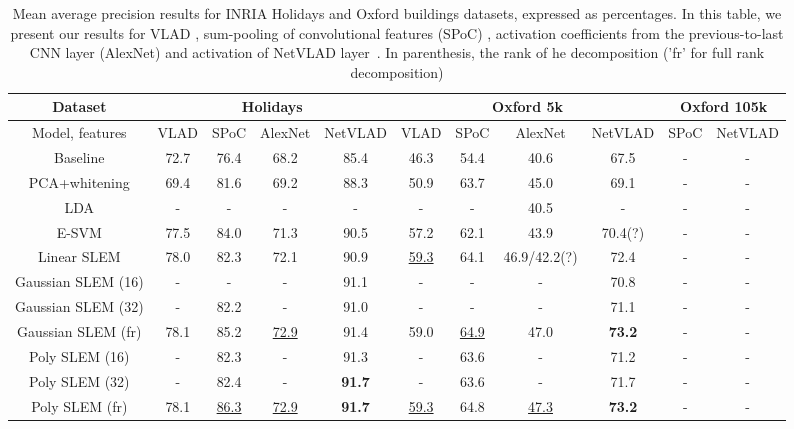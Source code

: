 \begin{table*}[h!]
\begin{center}
\setlength{\tabcolsep}{.2em}
\begin{tabular}{c@{\hskip 1em}cccc@{\hskip 1em}cccc@{\hskip 1em}cc}%
\toprule
Dataset & \multicolumn{4}{c}{\textbf{Holidays}} & \multicolumn{4}{c}{\textbf{Oxford 5k}} & \multicolumn{2}{c}{\textbf{Oxford 105k}} \\
\midrule
Model, features & VLAD  & SPoC & AlexNet & NetVLAD & VLAD & SPoC & AlexNet & NetVLAD & SPoC & NetVLAD\\
\midrule
Baseline            & 72.7 & 76.4 & 68.2  &  85.4 & 46.3 & 54.4 & 40.6 & 67.5 & - & - \\
PCA+whitening       & 69.4 & 81.6 & 69.2 & 88.3  & 50.9  & 63.7 & 45.0 & 69.1 & - & - \\
LDA                 & -   &   -   &  -   &   -   &   -   &   -  & 40.5 &  -  & - & - \\
E-SVM               & 77.5 & 84.0 & 71.3 & 90.5 & 57.2  & 62.1 & 43.9 & 70.4(?) & - & - \\
Linear SLEM         & 78.0   & 82.3 & 72.1 & 90.9& \ul{59.3}  & 64.1 & 46.9/42.2(?) & 72.4 & - & - \\
Gaussian SLEM (16)  & - & - & - & 91.1 & - & - & - & 70.8 & - & - \\
Gaussian SLEM (32)  & - & 82.2 & - & 91.0 & - & - & - & 71.1 & - & - \\
Gaussian SLEM (fr)  & 78.1 & 85.2 & \ul{72.9} & 91.4 & 59.0   & \ul{64.9} & 47.0 & \bf{73.2} & - & - \\
Poly SLEM (16)      & - & 82.3 & - & 91.3 & - & 63.6 & - & 71.2 & - & - \\
Poly SLEM (32)      & - & 82.4 & - & \bf{91.7} & - & 63.6 & - & 71.7 & - & - \\
Poly SLEM   (fr)    & 78.1 & \ul{86.3}  & \ul{72.9} & \bf{91.7} & \ul{59.3}  & 64.8 & \ul{47.3} & \bf{73.2} & - & - \\
\hline
\end{tabular}
\caption{Mean average precision results for INRIA Holidays and Oxford buildings datasets, expressed as percentages. In this table, we present our results for VLAD \cite{Delhumeau2013}, sum-pooling of convolutional features (SPoC) \cite{babenko15}, activation coefficients from the previous-to-last CNN layer (AlexNet) \cite{Krizhevsky2012} and activation of NetVLAD layer~\cite{Arandjelovic15}. In parenthesis, the rank of he decomposition ('fr' for full rank decomposition)}
\end{center}
\label{fullrank:results}
\end{table*}

